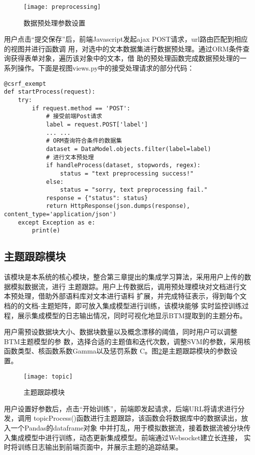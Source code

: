 \begin{figure}[H]
  \centering
  \texttt{[image: preprocessing]}
  \caption{数据预处理参数设置}
  \label{fig:preprocessing}
\end{figure}

用户点击“提交保存”后，前端Javascript发起ajax POST请求，url路由匹配到相应的视图并进行函数调
用，对选中的文本数据集进行数据预处理。通过ORM条件查询获得表单对象，遍历该对象中的文本，借
助的预处理函数完成数据预处理的一系列操作。下面是视图views.py中的接受处理请求的部分代码：

\begin{verbatim}
@csrf_exempt
def startProcess(request):
    try:
        if request.method == 'POST':
            # 接受前端Post请求    
            label = request.POST['label']
            ... ...
            # ORM查询符合条件的数据集
            dataset = DataModel.objects.filter(label=label)
            # 进行文本预处理
            if handleProcess(dataset, stopwords, regex):
                status = "text preprocessing success!"
            else:
                status = "sorry, text preprocessing fail."
            response = {"status": status}
            return HttpResponse(json.dumps(response), content_type='application/json')
    except Exception as e:
        print(e)
\end{verbatim}

\subsection{主题跟踪模块}
该模块是本系统的核心模块，整合第三章提出的集成学习算法，采用用户上传的数据模拟数据流，进行
主题跟踪。用户上传数据后，调用预处理模块对文档进行文本预处理，借助外部语料库对文本进行语料
扩展，并完成特征表示，得到每个文档的的文档-主题矩阵，即可放入集成模型进行训练，该模块能够
实时监控训练过程，展示集成模型的日志输出情况，同时可视化地显示BTM提取到的主题分布。

用户需预设数据块大小、数据块数量以及概念漂移的阈值，同时用户可以调整BTM主题模型的参
数，选择合适的主题值和迭代次数，调整SVM的参数，采用核函数类型、核函数系数Gamma以及惩罚系数
C。图\ref{fig:topic}是主题跟踪模块的参数设置。

\begin{figure}[H]
  \centering
  \texttt{[image: topic]}
  \caption{主题跟踪模块}
  \label{fig:topic}
\end{figure}

用户设置好参数后，点击“开始训练”，前端即发起请求，后端URL将请求进行分发，调用
topicProcess()函数进行主题跟踪，该函数会将数据库中的数据读出，放入一个Pandas的dataframe对象
中并打乱，用于模拟数据流，接着数据流被分块传入集成模型中进行训练，动态更新集成模型。前端通过Websocket建立长连接，
实时将训练日志输出到前端页面中，并展示主题的追踪结果。

